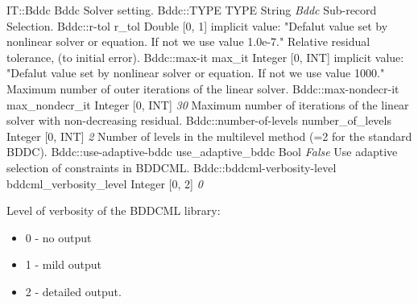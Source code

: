 \begin{RecordType}
	{IT::Bddc}
	{Bddc}
	{} %
	{} %
	{{{Solver setting.}}}
		\RecKey
			{Bddc::TYPE}
			{TYPE}
			{{String}}
			{ \it{Bddc} }
			{{{Sub-record Selection.}}}
		\RecKey
			{Bddc::r-tol}
			{r{\_}tol}
			{{Double [0, 1]}}
			{implicit value: "{Defalut value set by nonlinear solver or equation. If not we use value 1.0e-7.}"}
			{{{Relative residual tolerance,  (to initial error).}}}
		\RecKey
			{Bddc::max-it}
			{max{\_}it}
			{{Integer [0, INT]}}
			{implicit value: "{Defalut value set by nonlinear solver or equation. If not we use value 1000.}"}
			{{{Maximum number of outer iterations of the linear solver.}}}
		\RecKey
			{Bddc::max-nondecr-it}
			{max{\_}nondecr{\_}it}
			{{Integer [0, INT]}}
			{ \it{30} }
			{{{Maximum number of iterations of the linear solver with non-decreasing residual.}}}
		\RecKey
			{Bddc::number-of-levels}
			{number{\_}of{\_}levels}
			{{Integer [0, INT]}}
			{ \it{2} }
			{{{Number of levels in the multilevel method (=2 for the standard BDDC).}}}
		\RecKey
			{Bddc::use-adaptive-bddc}
			{use{\_}adaptive{\_}bddc}
			{{Bool}}
			{ \it{False} }
			{{{Use adaptive selection of constraints in BDDCML.}}}
		\RecKey
			{Bddc::bddcml-verbosity-level}
			{bddcml{\_}verbosity{\_}level}
			{{Integer [0, 2]}}
			{ \it{0} }
			{{{{Level of verbosity of the BDDCML library:}
}
\begin{itemize}
\item {0 - no output}
\item {1 - mild output}
\item {2 - detailed output.}
\end{itemize}
}}
\end{RecordType}

